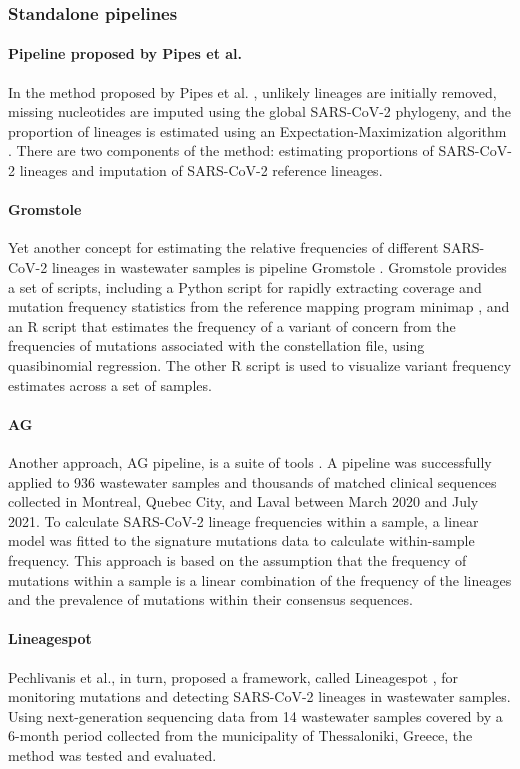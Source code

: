         \subsubsection{Standalone pipelines} \label{sec:prior:methods:pipelines}
        \paragraph{Pipeline proposed by Pipes et al.}
        In the method proposed by Pipes et al. \cite{pipes2022}, unlikely lineages are initially removed, missing nucleotides are imputed using the global SARS-CoV-2 phylogeny, and the proportion of lineages is estimated using an Expectation-Maximization algorithm \cite{dempster1977}. There are two components of the method: estimating proportions of SARS-CoV-2 lineages and imputation of SARS-CoV-2 reference lineages.
        \paragraph{Gromstole}
        Yet another concept for estimating the relative frequencies of different SARS-CoV-2 lineages in wastewater samples is pipeline Gromstole \cite{gromstole2022}. Gromstole provides a set of scripts, including a Python script for rapidly extracting coverage and mutation frequency statistics from the reference mapping program minimap \cite{li2018}, and an R script that estimates the frequency of a variant of concern from the frequencies of mutations associated with the constellation file, using quasibinomial regression. The other R script is used to visualize variant frequency estimates across a set of samples.
        \paragraph{AG}
        Another approach, AG pipeline, is a suite of tools \cite{nguessan2022}. A pipeline was successfully applied to 936 wastewater samples and thousands of matched clinical sequences collected in Montreal, Quebec City, and Laval between March 2020 and July 2021. To calculate SARS-CoV-2 lineage frequencies within a sample, a linear model was fitted to the signature mutations data to calculate within-sample frequency. This approach is based on the assumption that the frequency of mutations within a sample is a linear combination of the frequency of the lineages and the prevalence of mutations within their consensus sequences. 
        \paragraph{Lineagespot}
        Pechlivanis et al., in turn, proposed a framework, called Lineagespot \cite{pechlivanis2022}, for monitoring mutations and detecting SARS-CoV-2 lineages in wastewater samples. Using next-generation sequencing data from 14 wastewater samples covered by a 6-month period collected from the municipality of Thessaloniki, Greece, the method was tested and evaluated. 

